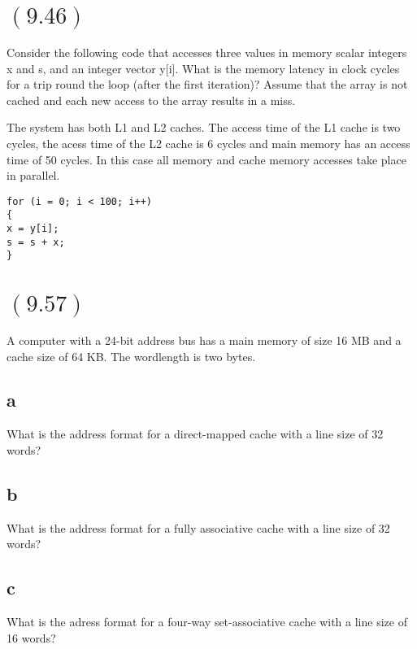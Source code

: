 \documentclass[letterpaper,12pt,titlepage]{article}
\begin{document}
\section*{$(9.46)$} Consider the following code that accesses three values in memory scalar integers x and s, and an integer vector y[i]. What is the memory latency in clock cycles for a trip round the loop (after the first iteration)? Assume that the array is not cached and each new access to the array results in a miss.

The system has both L1 and L2 caches. The access time of the L1 cache is two cycles, the acess time of the L2 cache is 6 cycles and main memory has an access time of 50 cycles. In this case all memory and cache memory accesses take place in parallel.

\lstset{language=C}
\begin{lstlisting}
for (i = 0; i < 100; i++)
{
x = y[i];
s = s + x;
}
\end{lstlisting}


\begin{mdframed}[style=MyFrame]
\end{mdframed}

\section*{$(9.57)$}

A computer with a 24-bit address bus has a main memory of size 16 MB and a cache size of 64 KB. The wordlength is two bytes.

\subsection*{a} What is the address format for a direct-mapped cache with a line size of 32 words?
\begin{mdframed}[style=MyFrame]
\end{mdframed}
\subsection*{b} What is the address format for a fully associative cache with a line size of 32 words?
\begin{mdframed}[style=MyFrame]
\end{mdframed}
\subsection*{c} What is the adress format for a four-way set-associative cache with a line size of 16 words?
\begin{mdframed}[style=MyFrame]
\end{mdframed}





\end{document}
